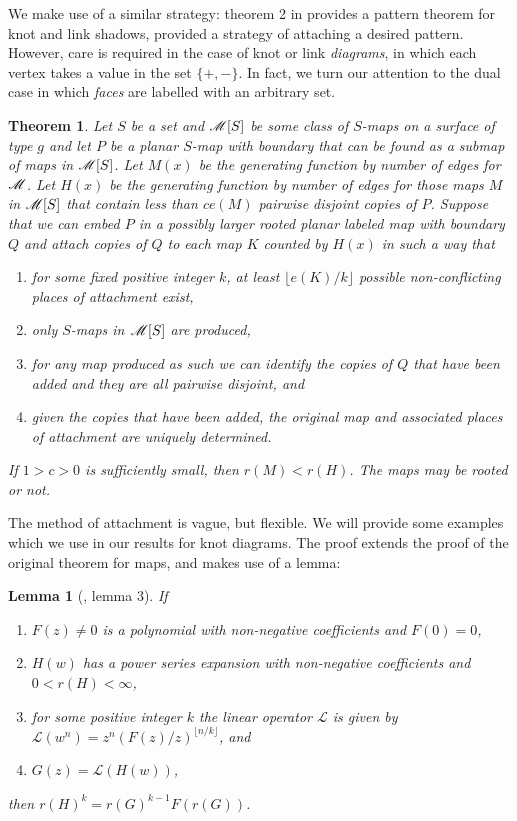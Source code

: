 \documentclass[amsmath,longbibliography,secnumarabic,floatfix,amssymb,nofootinbib,nobibnotes,letterpaper,11pt,tightenlines,notitlepage,showkeys,showlabels]{amsart}%
\newtheorem{theorem}{Theorem}
\newtheorem*{lemma*}{Lemma}
\begin{document}
We make use of a similar strategy: theorem 2 in \cite{Bender1992104}
provides a pattern theorem for knot and link shadows, provided a
strategy of attaching a desired pattern. However, care is required in
the case of knot or link \emph{diagrams}, in which each vertex takes a
value in the set $\{+, -\}$. In fact, we turn our attention to the
dual case in which \emph{faces} are labelled with an arbitrary set.

\begin{theorem}Let $S$ be a set and $\mathscr{M}[S]$ be some class of
  $S$-maps on a surface of type $g$ and let $P$ be a planar $S$-map
  with boundary that can be found as a submap of maps in
  $\mathscr{M}[S]$. Let $M(x)$ be the generating function by number of
  edges for $\mathscr{M}$. Let $H(x)$ be the generating function by
  number of edges for those maps $M$ in $\mathscr{M}[S]$ that contain
  less than $ce(M)$ pairwise disjoint copies of $P$. Suppose that we
  can embed $P$ in a possibly larger rooted planar labeled map with
  boundary $Q$ and attach copies of $Q$ to each map $K$
  counted by $H(x)$ in such a way that
  \begin{enumerate}
  \item for some fixed positive integer $k$, at least $\lfloor e(K)/k \rfloor$ possible
    non-conflicting places of attachment exist,
  \item only $S$-maps in $\mathscr{M}[S]$ are produced,
  \item for any map produced as such we can identify the copies of $Q$ that have been added and they
    are all pairwise disjoint, and
  \item given the copies that have been added, the original map and associated places of attachment
    are uniquely determined.
  \end{enumerate} If $1 > c > 0$ is sufficiently small, then $r(M) < r(H)$. The maps may be rooted or
  not.
  \label{thr:weakpattern}
\end{theorem}

The method of attachment is vague, but flexible. We will provide some examples which we use in our
results for knot diagrams. The proof extends the proof of the original theorem for maps, and makes
use of a lemma:


\begin{lemma*}[\cite{Bender1992104}, lemma 3]
 If
 \begin{enumerate}
 \item $F(z) \ne 0$ is a polynomial with non-negative coefficients and $F(0) = 0$,
 \item $H(w)$ has a power series expansion with non-negative coefficients and $0 < r(H) < \infty$,
 \item for some positive integer $k$ the linear operator $\mathscr{L}$ is given by $\mathscr{L}(w^n)
   = z^n(F(z)/z)^{\lfloor n/k \rfloor}$, and
 \item $G(z) = \mathscr{L}(H(w))$,
 \end{enumerate}
 then $r(H)^k = r(G)^{k-1}F(r(G))$.
\end{lemma*}
\end{document}
